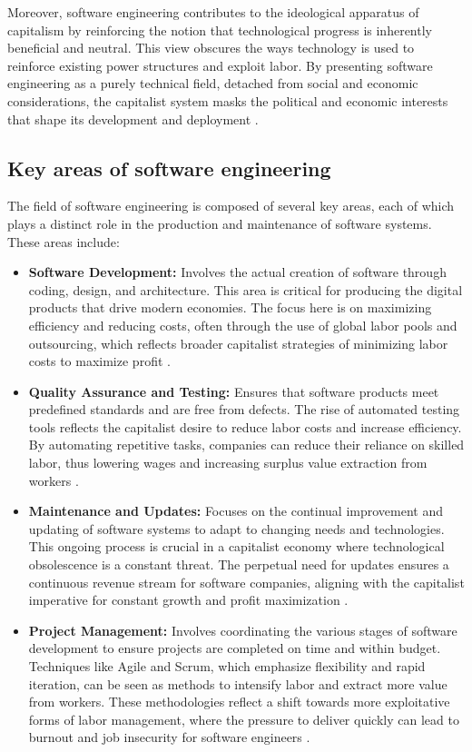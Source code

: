 \begin{refsection}
Moreover, software engineering contributes to the ideological apparatus of capitalism by reinforcing the notion that technological progress is inherently beneficial and neutral. This view obscures the ways technology is used to reinforce existing power structures and exploit labor. By presenting software engineering as a purely technical field, detached from social and economic considerations, the capitalist system masks the political and economic interests that shape its development and deployment \cite[pp.~45-47]{humphrey_1995}.

\subsection{Key areas of software engineering}
The field of software engineering is composed of several key areas, each of which plays a distinct role in the production and maintenance of software systems. These areas include:

\begin{itemize}
    \item \textbf{Software Development:} Involves the actual creation of software through coding, design, and architecture. This area is critical for producing the digital products that drive modern economies. The focus here is on maximizing efficiency and reducing costs, often through the use of global labor pools and outsourcing, which reflects broader capitalist strategies of minimizing labor costs to maximize profit \cite[pp.~131-134]{glass_software}.
    \item \textbf{Quality Assurance and Testing:} Ensures that software products meet predefined standards and are free from defects. The rise of automated testing tools reflects the capitalist desire to reduce labor costs and increase efficiency. By automating repetitive tasks, companies can reduce their reliance on skilled labor, thus lowering wages and increasing surplus value extraction from workers \cite[pp.~145-148]{humphrey_1995}.
    \item \textbf{Maintenance and Updates:} Focuses on the continual improvement and updating of software systems to adapt to changing needs and technologies. This ongoing process is crucial in a capitalist economy where technological obsolescence is a constant threat. The perpetual need for updates ensures a continuous revenue stream for software companies, aligning with the capitalist imperative for constant growth and profit maximization \cite[pp.~151-153]{humphrey_1995}.
    \item \textbf{Project Management:} Involves coordinating the various stages of software development to ensure projects are completed on time and within budget. Techniques like Agile and Scrum, which emphasize flexibility and rapid iteration, can be seen as methods to intensify labor and extract more value from workers. These methodologies reflect a shift towards more exploitative forms of labor management, where the pressure to deliver quickly can lead to burnout and job insecurity for software engineers \cite[pp.~136-139]{braverman_1974}.
\end{itemize}


\end{refsection}
